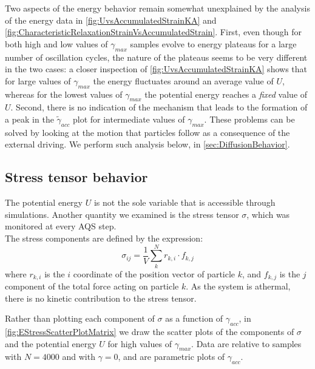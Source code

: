 Two aspects of the energy behavior remain somewhat unexplained by the analysis of the energy data in \autoref{fig:UvsAccumulatedStrainKA} and \autoref{fig:CharacteristicRelaxationStrainVsAccumulatedStrain}. First, even though for both high and low values of $\gamma_{max}$ samples evolve to energy plateaus for a large number of oscillation cycles, the nature of the plateaus seems to be very different in the two cases: a closer inspection of \autoref{fig:UvsAccumulatedStrainKA} shows that for large values of $\gamma_{max}$ the energy fluctuates around an average value of $U$, whereas for the lowest values of $\gamma_{max}$ the potential energy reaches a \emph{fixed} value of $U$. Second, there is no indication of the mechanism that leads to the formation of a peak in the $\widetilde{\gamma}_{acc}$ plot for intermediate values of $\gamma_{max}$. These problems can be solved by looking at the motion that particles follow as a consequence of the external driving. We perform such analysis below, in \autoref{sec:DiffusionBehavior}.

\subsection{Stress tensor behavior}

The potential energy $U$ is not the sole variable that is accessible through simulations. Another quantity we examined is the stress tensor $\sigma$, which was monitored at every AQS step. \\
The stress components are defined by the expression:
\begin{equation}
	\sigma_{ij} = \frac{1}{V} \sum_{k}^{N} r_{k,i} \cdot f_{k,j}
	\label{eq:StressTensorComponent}
\end{equation}
where $r_{k,i}$ is the $i$ coordinate of the position vector of particle $k$, and $f_{k,j}$ is the $j$ component of the total force acting on particle $k$. As the system is athermal, there is no kinetic contribution to the stress tensor.

Rather than plotting each component of $\sigma$ as a function of $\gamma_{acc}$, in \autoref{fig:EStressScatterPlotMatrix} we draw the scatter plots of the components of $\sigma$ and the potential energy $U$ for high values of $\gamma_{max}$. Data are relative to samples with $N=4000$ and  with $\gamma = 0$, and are parametric plots of $\gamma_{acc}$.

